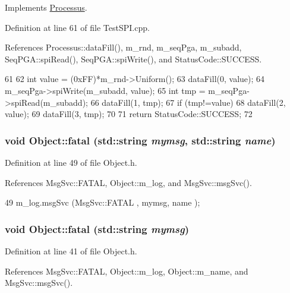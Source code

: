 Implements \hyperlink{classProcessus_a63767a63a1fb0055c5aa45b21a4a5d58}{Processus}.

Definition at line 61 of file TestSPI.cpp.

References Processus::dataFill(), m\_\-rnd, m\_\-seqPga, m\_\-subadd, SeqPGA::spiRead(), SeqPGA::spiWrite(), and StatusCode::SUCCESS.


\begin{DoxyCode}
61                               {
62   int value = (0xFF)*m_rnd->Uniform();
63   dataFill(0, value);
64   m_seqPga->spiWrite(m_subadd, value);
65   int tmp = m_seqPga->spiRead(m_subadd);
66   dataFill(1, tmp);
67   if (tmp!=value){
68     dataFill(2, value);
69     dataFill(3, tmp);
70   }
71   return StatusCode::SUCCESS;
72 }
\end{DoxyCode}
\hypertarget{classObject_ae62acd3d09f716220f75f252dc38bc9a}{
\subsubsection[{fatal}]{\setlength{\rightskip}{0pt plus 5cm}void Object::fatal (std::string {\em mymsg}, \/  std::string {\em name})}}
\label{classObject_ae62acd3d09f716220f75f252dc38bc9a}


Definition at line 49 of file Object.h.

References MsgSvc::FATAL, Object::m\_\-log, and MsgSvc::msgSvc().


\begin{DoxyCode}
49 { m_log.msgSvc (MsgSvc::FATAL   , mymsg, name ); }
\end{DoxyCode}
\hypertarget{classObject_aad5a16aac7516ce65bd5ec02ab07fc80}{
\subsubsection[{fatal}]{\setlength{\rightskip}{0pt plus 5cm}void Object::fatal (std::string {\em mymsg})}}
\label{classObject_aad5a16aac7516ce65bd5ec02ab07fc80}


Definition at line 41 of file Object.h.

References MsgSvc::FATAL, Object::m\_\-log, Object::m\_\-name, and MsgSvc::msgSvc().

